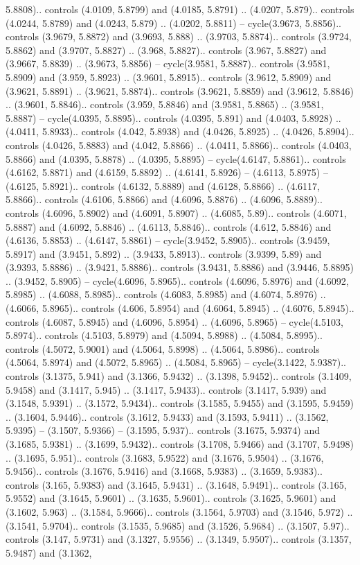 5.8808).. controls (4.0109, 5.8799) and (4.0185, 5.8791) .. (4.0207, 5.879).. controls (4.0244, 5.8789) and (4.0243, 5.879) .. (4.0202, 5.8811) -- cycle(3.9673, 5.8856).. controls (3.9679, 5.8872) and (3.9693, 5.888) .. (3.9703, 5.8874).. controls (3.9724, 5.8862) and (3.9707, 5.8827) .. (3.968, 5.8827).. controls (3.967, 5.8827) and (3.9667, 5.8839) .. (3.9673, 5.8856) -- cycle(3.9581, 5.8887).. controls (3.9581, 5.8909) and (3.959, 5.8923) .. (3.9601, 5.8915).. controls (3.9612, 5.8909) and (3.9621, 5.8891) .. (3.9621, 5.8874).. controls (3.9621, 5.8859) and (3.9612, 5.8846) .. (3.9601, 5.8846).. controls (3.959, 5.8846) and (3.9581, 5.8865) .. (3.9581, 5.8887) -- cycle(4.0395, 5.8895).. controls (4.0395, 5.891) and (4.0403, 5.8928) .. (4.0411, 5.8933).. controls (4.042, 5.8938) and (4.0426, 5.8925) .. (4.0426, 5.8904).. controls (4.0426, 5.8883) and (4.042, 5.8866) .. (4.0411, 5.8866).. controls (4.0403, 5.8866) and (4.0395, 5.8878) .. (4.0395, 5.8895) -- cycle(4.6147, 5.8861).. controls (4.6162, 5.8871) and (4.6159, 5.8892) .. (4.6141, 5.8926) -- (4.6113, 5.8975) -- (4.6125, 5.8921).. controls (4.6132, 5.8889) and (4.6128, 5.8866) .. (4.6117, 5.8866).. controls (4.6106, 5.8866) and (4.6096, 5.8876) .. (4.6096, 5.8889).. controls (4.6096, 5.8902) and (4.6091, 5.8907) .. (4.6085, 5.89).. controls (4.6071, 5.8887) and (4.6092, 5.8846) .. (4.6113, 5.8846).. controls (4.612, 5.8846) and (4.6136, 5.8853) .. (4.6147, 5.8861) -- cycle(3.9452, 5.8905).. controls (3.9459, 5.8917) and (3.9451, 5.892) .. (3.9433, 5.8913).. controls (3.9399, 5.89) and (3.9393, 5.8886) .. (3.9421, 5.8886).. controls (3.9431, 5.8886) and (3.9446, 5.8895) .. (3.9452, 5.8905) -- cycle(4.6096, 5.8965).. controls (4.6096, 5.8976) and (4.6092, 5.8985) .. (4.6088, 5.8985).. controls (4.6083, 5.8985) and (4.6074, 5.8976) .. (4.6066, 5.8965).. controls (4.606, 5.8954) and (4.6064, 5.8945) .. (4.6076, 5.8945).. controls (4.6087, 5.8945) and (4.6096, 5.8954) .. (4.6096, 5.8965) -- cycle(4.5103, 5.8974).. controls (4.5103, 5.8979) and (4.5094, 5.8988) .. (4.5084, 5.8995).. controls (4.5072, 5.9001) and (4.5064, 5.8998) .. (4.5064, 5.8986).. controls (4.5064, 5.8974) and (4.5072, 5.8965) .. (4.5084, 5.8965) -- cycle(3.1422, 5.9387).. controls (3.1375, 5.941) and (3.1366, 5.9432) .. (3.1398, 5.9452).. controls (3.1409, 5.9458) and (3.1417, 5.945) .. (3.1417, 5.9433).. controls (3.1417, 5.939) and (3.1548, 5.9391) .. (3.1572, 5.9434).. controls (3.1585, 5.9455) and (3.1595, 5.9459) .. (3.1604, 5.9446).. controls (3.1612, 5.9433) and (3.1593, 5.9411) .. (3.1562, 5.9395) -- (3.1507, 5.9366) -- (3.1595, 5.937).. controls (3.1675, 5.9374) and (3.1685, 5.9381) .. (3.1699, 5.9432).. controls (3.1708, 5.9466) and (3.1707, 5.9498) .. (3.1695, 5.951).. controls (3.1683, 5.9522) and (3.1676, 5.9504) .. (3.1676, 5.9456).. controls (3.1676, 5.9416) and (3.1668, 5.9383) .. (3.1659, 5.9383).. controls (3.165, 5.9383) and (3.1645, 5.9431) .. (3.1648, 5.9491).. controls (3.165, 5.9552) and (3.1645, 5.9601) .. (3.1635, 5.9601).. controls (3.1625, 5.9601) and (3.1602, 5.963) .. (3.1584, 5.9666).. controls (3.1564, 5.9703) and (3.1546, 5.972) .. (3.1541, 5.9704).. controls (3.1535, 5.9685) and (3.1526, 5.9684) .. (3.1507, 5.97).. controls (3.147, 5.9731) and (3.1327, 5.9556) .. (3.1349, 5.9507).. controls (3.1357, 5.9487) and (3.1362, 